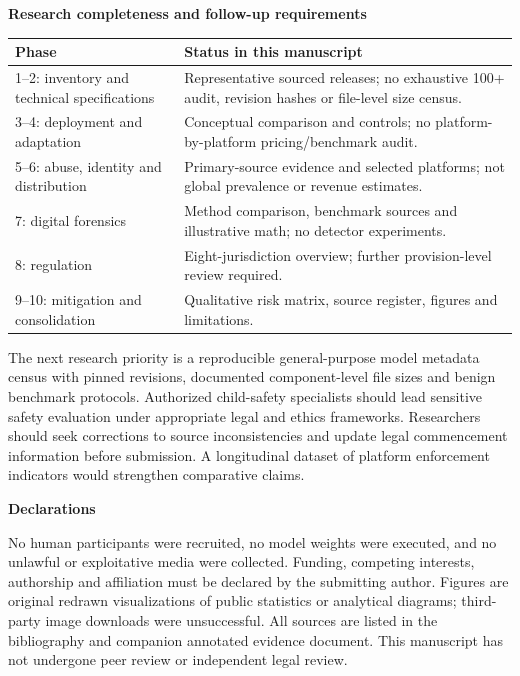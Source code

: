 \documentclass[11pt,a4paper]{article}
\newcommand{\sub}[1]{\vspace{1mm}\textbf{#1}\par}
\begin{document}
\sub{Research completeness and follow-up requirements}

\begin{center}\small\begin{tabularx}{\linewidth}{@{}YY@{}}\toprule
\textbf{Phase} & \textbf{Status in this manuscript}\\--2: inventory and technical specifications & Representative sourced releases; no exhaustive 100+ audit, revision hashes or file-level size census.\\
3--4: deployment and adaptation & Conceptual comparison and controls; no platform-by-platform pricing/benchmark audit.\\
5--6: abuse, identity and distribution & Primary-source evidence and selected platforms; not global prevalence or revenue estimates.\\
7: digital forensics & Method comparison, benchmark sources and illustrative math; no detector experiments.\\
8: regulation & Eight-jurisdiction overview; further provision-level review required.\\
9--10: mitigation and consolidation & Qualitative risk matrix, source register, figures and limitations.\\\bottomrule\end{tabularx}\end{center}

The next research priority is a reproducible general-purpose model metadata census with pinned revisions, documented component-level file sizes and benign benchmark protocols. Authorized child-safety specialists should lead sensitive safety evaluation under appropriate legal and ethics frameworks. Researchers should seek corrections to source inconsistencies and update legal commencement information before submission. A longitudinal dataset of platform enforcement indicators would strengthen comparative claims.


\sub{Declarations}

No human participants were recruited, no model weights were executed, and no unlawful or exploitative media were collected. Funding, competing interests, authorship and affiliation must be declared by the submitting author. Figures are original redrawn visualizations of public statistics or analytical diagrams; third-party image downloads were unsuccessful. All sources are listed in the bibliography and companion annotated evidence document. This manuscript has not undergone peer review or independent legal review.
\end{document}
